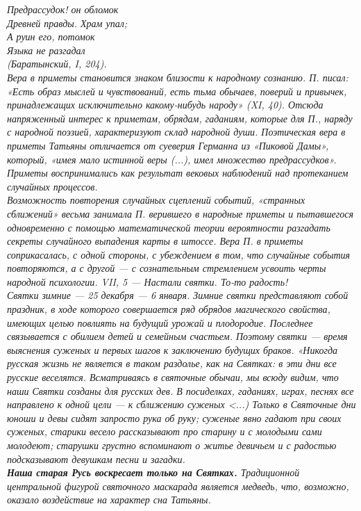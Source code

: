 \emph{Предрассудок! он обломок\\
Древней правды. Храм упал;\\
А руин его, потомок\\ 
Языка не разгадал\\
 (Баратынский, I, 204).\\
 Вера в приметы становится знаком близости к народному сознанию.
 П. писал: «Есть образ мыслей и чувствований, есть тьма обычаев, поверий и привычек, принадлежащих исключительно какому-нибудь народу» 
(XI, 40). Отсюда напряженный интерес к приметам, обрядам, гаданиям, которые для П., наряду с народной поэзией, характеризуют склад народной души. Поэтическая вера в приметы Татьяны отличается от суеверия Германна из «Пиковой Дамы», который, «имея мало истинной веры (...), имел множество предрассудков».  Приметы воспринимались как результат вековых наблюдений над протеканием случайных процессов.\\
Возможность повторения случайных сцеплений событий, «странных сближений» весьма занимала П. верившего в народные приметы и пытавшегося одновременно с помощью математической теории вероятности разгадать секреты случайного выпадения карты в штоссе. Вера П. в приметы соприкасалась, с одной стороны, 
с убеждением в том, что случайные события повторяются, а с другой — с сознательным стремлением усвоить черты народной психологии.
\emph{VII, 5 — Настали святки. То-то радость!}\\
Святки зимние — 25 декабря — 6 января. Зимние святки представляют собой праздник, в ходе которого совершается ряд обрядов магического свойства, имеющих целью повлиять на будущий урожай и плодородие. Последнее 
связывается с обилием детей и семейным счастьем. 
Поэтому святки — время выяснения суженых и первых шагов к заключению будущих браков. «Никогда русская жизнь не является в таком раздолье, как на 
Святках: в эти дни все русские веселятся. Всматриваясь в святочные обычаи, мы всюду видим, что наши Святки созданы для русских дев. В посиделках, гаданиях, играх, песнях все направлено к одной цели — к сближению суженых <...) Только в Святочные дни юноши и девы сидят запросто рука об руку; суженые явно гадают при своих суженых, старики весело рассказывают про старину и с молодыми сами молодеют; старушки грустно вспоминают о житье девичьем и с радостью подсказывают девушкам песни и загадки.\\
\textbf{Наша старая Русь воскресает только на Святках.}
Традиционной центральной фигурой святочного маскарада является 
медведь, что, возможно, оказало воздействие на характер сна Татьяны. 
}

